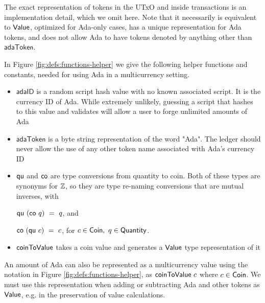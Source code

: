 The exact representation of tokens in the UTxO and inside transactions
is an implementation detail, which we omit here.
Note that it necessarily is equivalent to $\mathsf{Value}$, optimized
for Ada-only cases, has a unique representation for Ada tokens,
and does not allow Ada to have tokens denoted by anything other than $\mathsf{adaToken}$.

In Figure \ref{fig:defs:functions-helper} we give the following helper functions
and constants, needed for using Ada in a multicurrency setting.

\begin{itemize}
  \item $\mathsf{adaID}$ is a random script hash value with no known associated
  script. It is the currency ID of Ada. While extremely unlikely, guessing a
  script that hashes to this value
  and validates will allow a user to forge unlimited amounts of Ada
  \item $\mathsf{adaToken}$ is a byte string representation of the word "Ada".
  The ledger should never allow the use of any other token name associated
  with Ada's currency ID
  \item $\mathsf{qu}$ and $\mathsf{co}$ are type conversions from quantity to
  coin. Both of these types are synonyms for $\mathbb{Z}$, so they are
  type re-naming conversions that are mutual inverses, with

  $\mathsf{qu} ~(\mathsf{co} ~q )~= ~q$, and

  $\mathsf{co}~ (\mathsf{qu}~ c) ~=~ c$, for $c \in \mathsf{Coin},~q \in \mathsf{Quantity}$.

  \item $\mathsf{coinToValue}$ takes a coin value and generates a $\mathsf{Value}$ type representation
  of it
\end{itemize}

An amount of Ada can also be represented as a multicurrency value
using the notation in Figure \ref{fig:defs:functions-helper}, as
$\mathsf{coinToValue}~c$ where $c \in \mathsf{Coin}$. We must use this representation
when adding or subtracting Ada and other tokens as $\mathsf{Value}$, e.g. in the
preservation of value calculations.

